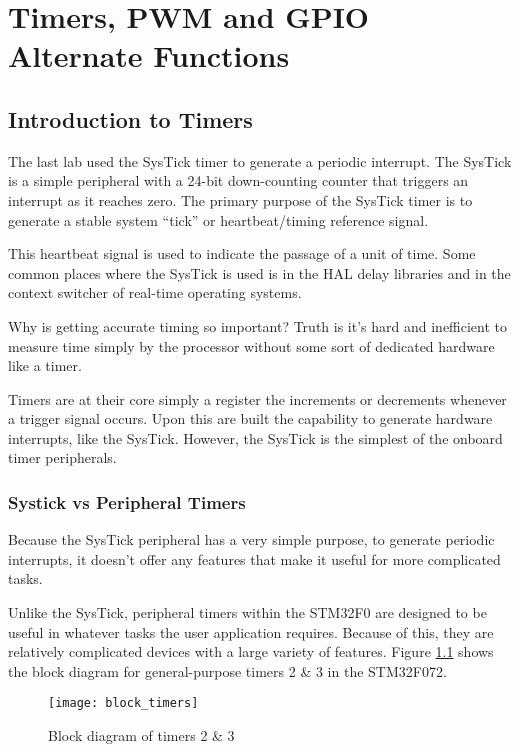 \documentclass[11pt,fleqn]{book} %
\begin{document}
	
\chapter{Timers, PWM and GPIO Alternate Functions}

\section{Introduction to Timers}
The last lab used the SysTick timer to generate a periodic interrupt. The SysTick is a simple peripheral with a 24-bit down-counting counter that triggers an interrupt as it reaches zero. The primary purpose of the SysTick timer is to generate a stable system ``tick'' or heartbeat/timing reference signal. 

This heartbeat signal is used to indicate the passage of a unit of time. Some common places where the SysTick is used is in the HAL delay libraries and in the context switcher of real-time operating systems. 

Why is getting accurate timing so important? Truth is it's hard and inefficient to measure time simply by the processor without some sort of dedicated hardware like a timer. 

Timers are at their core simply a register the increments or decrements whenever a trigger signal occurs. Upon this are built the capability to generate hardware interrupts, like the SysTick. However, the SysTick is the simplest of the onboard timer peripherals.
    
    \subsection{Systick vs Peripheral Timers}
     Because the SysTick peripheral has a very simple purpose, to generate periodic interrupts, it doesn't offer any features that make it useful for more complicated tasks. 
     
     Unlike the SysTick, peripheral timers within the STM32F0 are designed to be useful in whatever tasks the user application requires. Because of this, they are relatively complicated devices with a large variety of features. Figure \ref{block_timers} shows the block diagram for general-purpose timers 2 \& 3 in the STM32F072.  

        \begin{figure}[]
            \centering\texttt{[image: block\_timers]}
            \caption{Block diagram of timers 2 \& 3}
            \label{block_timers}
        \end{figure}
        
\end{document}
